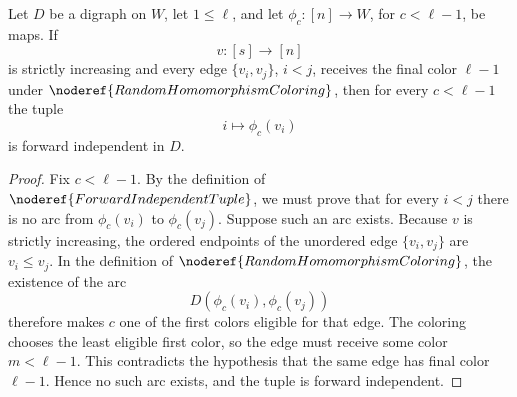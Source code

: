 \begin{helper}
Let \(D\) be a digraph on \(W\), let \(1\le\ell\), and let
\(\phi_c:[n]\to W\), for \(c<\ell-1\), be maps.  If
\[
  v:[s]\to[n]
\]
is strictly increasing and every edge \(\{v_i,v_j\}\), \(i<j\), receives the
final color \(\ell-1\) under \(\noderef{RandomHomomorphismColoring}\), then
for every \(c<\ell-1\) the tuple
\[
  i\mapsto \phi_c(v_i)
\]
is forward independent in \(D\).
\end{helper}
\begin{proof}
Fix \(c<\ell-1\).  By the definition of
\(\noderef{ForwardIndependentTuple}\), we must prove that for every \(i<j\)
there is no arc from \(\phi_c(v_i)\) to \(\phi_c(v_j)\).  Suppose such an arc
exists.
Because \(v\) is strictly increasing, the ordered endpoints of the unordered
edge \(\{v_i,v_j\}\) are \(v_i\le v_j\).  In the definition of
\(\noderef{RandomHomomorphismColoring}\), the existence of the arc
\[
  D(\phi_c(v_i),\phi_c(v_j))
\]
therefore makes \(c\) one of the first colors eligible for that edge.  The
coloring chooses the least eligible first color, so the edge must receive
some color \(m<\ell-1\).  This contradicts the hypothesis that the same edge
has final color \(\ell-1\).  Hence no such arc exists, and the tuple is
forward independent.
\end{proof}
